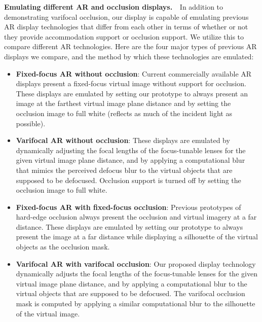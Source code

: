 {\bf Emulating different AR and occlusion displays. $\,\,$}
In addition to demonstrating varifocal occlusion, our display is capable of emulating previous AR display technologies that differ from each other in terms of whether or not they provide accommodation support or occlusion support. We utilize this to compare different AR technologies. Here are the four major types of previous AR displays we compare, and the method by which these technologies are emulated: 
\begin{itemize}
\item \textbf{Fixed-focus AR without occlusion}: Current commercially available AR displays present a fixed-focus virtual image without support for occlusion. These displays are emulated by setting our prototype to always present an image at the farthest virtual image plane distance and by setting the occlusion image to full white (reflects as much of the incident light as possible).
\item \textbf{Varifocal AR without occlusion}: These displays are emulated by dynamically adjusting the focal lengths of the focus-tunable lenses for the given virtual image plane distance, and by applying a computational blur that mimics the perceived defocus blur to the virtual objects that are supposed to be defocused. Occlusion support is turned off by setting the occlusion image to full white.
\item \textbf{Fixed-focus AR with fixed-focus occlusion}: Previous prototypes of hard-edge occlusion always present the occlusion and virtual imagery at a far distance. These displays are emulated by setting our prototype to always present the image at a far distance while displaying a silhouette of the virtual objects as the occlusion mask.
\item \textbf{Varifocal AR with varifocal occlusion}: Our proposed display technology dynamically adjusts the focal lengths of the focus-tunable lenses for the given virtual image plane distance, and by applying a computational blur to the virtual objects that are supposed to be defocused. The varifocal occlusion mask is computed by applying a similar computational blur to the silhouette of the virtual image.
\end{itemize}


